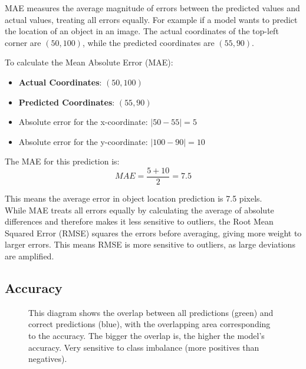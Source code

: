 \documentclass[12pt]{article}
\begin{document}
MAE measures the average magnitude of errors between the predicted values and actual values, treating all errors equally. For example if a model wants to predict the location of an object in an image. The actual coordinates of the top-left corner are \((50, 100)\), while the predicted coordinates are \((55, 90)\).

To calculate the Mean Absolute Error (MAE):

\begin{itemize}
    \item \textbf{Actual Coordinates}: \((50, 100)\)
    \item \textbf{Predicted Coordinates}: \((55, 90)\)
    \item Absolute error for the x-coordinate: \( |50 - 55| = 5 \)
    \item Absolute error for the y-coordinate: \( |100 - 90| = 10 \)
\end{itemize}

The MAE for this prediction is:
\[MAE = \frac{5 + 10}{2} = 7.5\]

This means the average error in object location prediction is 7.5 pixels.
\\
While MAE treats all errors equally by calculating the average of absolute differences and therefore makes it less sensitive to outliers, the Root Mean Squared Error (RMSE) squares the errors before averaging, giving more weight to larger errors. This means RMSE is more sensitive to outliers, as large deviations are amplified.


\subsection{Accuracy}
\begin{figure}[h]
\centering
{}
    \caption{This diagram shows the overlap between all predictions (green) and correct predictions (blue), with the overlapping area corresponding to the accuracy. The bigger the overlap is, the higher the model's accuracy. Very sensitive to class imbalance (more positives than negatives).}
\end{figure}
\end{document}
